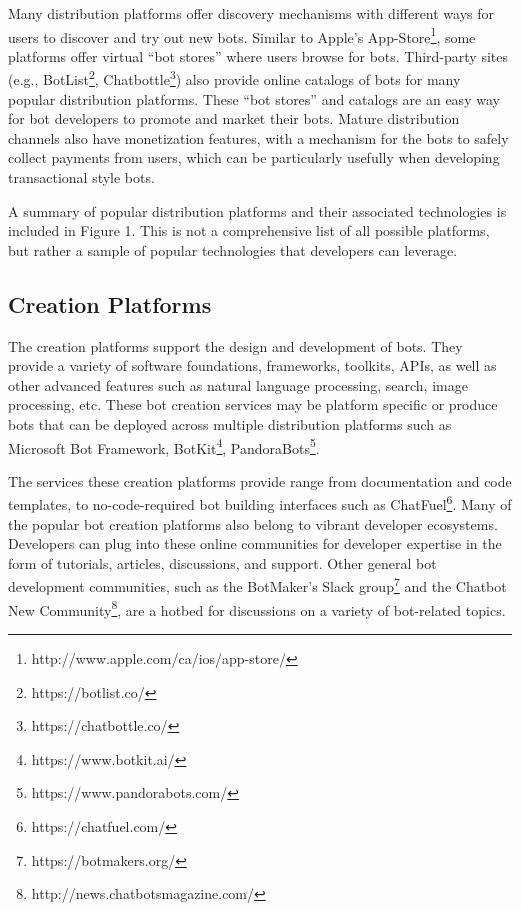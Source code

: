 \documentclass{sig-alternate}
\begin{document}
	Many distribution platforms offer discovery mechanisms with different ways for users to discover and try out new bots. Similar to Apple's App-Store\footnote{http://www.apple.com/ca/ios/app-store/}, some platforms offer virtual ``bot stores'' where users browse for bots. Third-party sites (e.g., BotList\footnote{https://botlist.co/}, Chatbottle\footnote{https://chatbottle.co/}) also provide online catalogs of bots for many popular distribution platforms. These ``bot stores'' and catalogs are an easy way for bot developers to promote and market their bots. 
	Mature distribution channels also have monetization features, with a mechanism for the bots to safely collect payments from users, which can be particularly usefully when developing transactional style bots.

	A summary of popular distribution platforms and their associated technologies is included in Figure 1.  This is not a comprehensive list of all possible platforms, but rather a sample of popular technologies that developers can leverage.

	\subsection{Creation Platforms}

	The creation platforms support the design and development of bots. They provide a variety of software foundations, frameworks, toolkits, APIs, as well as other advanced features such as natural language processing, search, image processing, etc. These bot creation services may be platform specific or produce bots that can be deployed across multiple distribution platforms such as Microsoft Bot Framework, BotKit\footnote{https://www.botkit.ai/}, PandoraBots\footnote{https://www.pandorabots.com/}. 
	
	The services these creation platforms provide range from documentation and code templates, to no-code-required bot building interfaces such as ChatFuel\footnote{https://chatfuel.com/}. 
	Many of the popular bot creation platforms also belong to vibrant developer ecosystems. Developers can plug into these online communities for developer expertise in the form of tutorials, articles, discussions, and support.  Other general bot development communities, such as the BotMaker's Slack group\footnote{https://botmakers.org/} and the Chatbot New Community\footnote{http://news.chatbotsmagazine.com/}, are a hotbed for discussions on a variety of bot-related topics.
\end{document}
